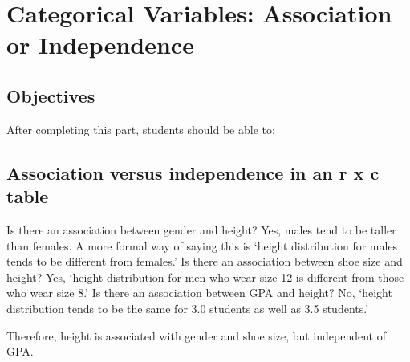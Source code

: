 \documentclass[11pt]{book}\usepackage[]{graphicx}\usepackage[]{color}
\begin{document}
\onecolumn












\chapter{Categorical Variables: Association or Independence}
\label{chap:ch14}

\section{Objectives}

After completing this part, students should be able to:


\section{Association versus independence in an r x c table}  

Is there an association between gender and height?  Yes, males tend to be taller than females.  A more formal way of saying this is `height distribution for males tends to be different from females.'   Is there an association between shoe size and height?  Yes,  `height distribution for men who wear size 12 is different from those who wear size 8.'    Is there an association between GPA and height?  No, `height distribution tends to be the same for 3.0 students as well as 3.5 students.'


Therefore, height is associated with gender and shoe size, but independent of GPA.  
\end{document}
